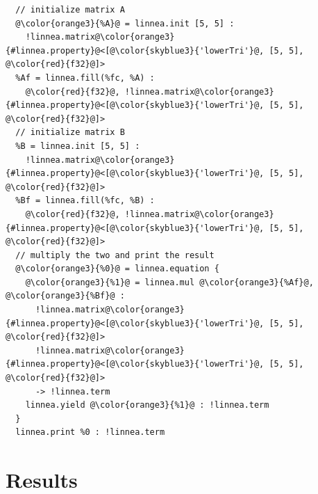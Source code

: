 \documentclass[conference]{IEEEtran}
\begin{document}
\begin{listing}[]
\begin{center}
\begin{minipage}[]{0.5\textwidth}
\begin{verbatim}
  // initialize matrix A
  @\color{orange3}{%A}@ = linnea.init [5, 5] : 
    !linnea.matrix@\color{orange3}{#linnea.property}@<[@\color{skyblue3}{'lowerTri'}@, [5, 5], @\color{red}{f32}@]>
  %Af = linnea.fill(%fc, %A) : 
    @\color{red}{f32}@, !linnea.matrix@\color{orange3}{#linnea.property}@<[@\color{skyblue3}{'lowerTri'}@, [5, 5], @\color{red}{f32}@]>
  // initialize matrix B
  %B = linnea.init [5, 5] : 
    !linnea.matrix@\color{orange3}{#linnea.property}@<[@\color{skyblue3}{'lowerTri'}@, [5, 5], @\color{red}{f32}@]>
  %Bf = linnea.fill(%fc, %B) : 
    @\color{red}{f32}@, !linnea.matrix@\color{orange3}{#linnea.property}@<[@\color{skyblue3}{'lowerTri'}@, [5, 5], @\color{red}{f32}@]>
  // multiply the two and print the result
  @\color{orange3}{%0}@ = linnea.equation {
    @\color{orange3}{%1}@ = linnea.mul @\color{orange3}{%Af}@, @\color{orange3}{%Bf}@ :
      !linnea.matrix@\color{orange3}{#linnea.property}@<[@\color{skyblue3}{'lowerTri'}@, [5, 5], @\color{red}{f32}@]>
      !linnea.matrix@\color{orange3}{#linnea.property}@<[@\color{skyblue3}{'lowerTri'}@, [5, 5], @\color{red}{f32}@]> 
      -> !linnea.term
    linnea.yield @\color{orange3}{%1}@ : !linnea.term
  }
  linnea.print %0 : !linnea.term
\end{verbatim}
\end{minipage}
  \caption{A Linnea IR representation for a multiplication between two lower triangular matrices.}
\label{lst:endtoend}
\end{center}
\end{listing}

\section{Results}
\end{document}
